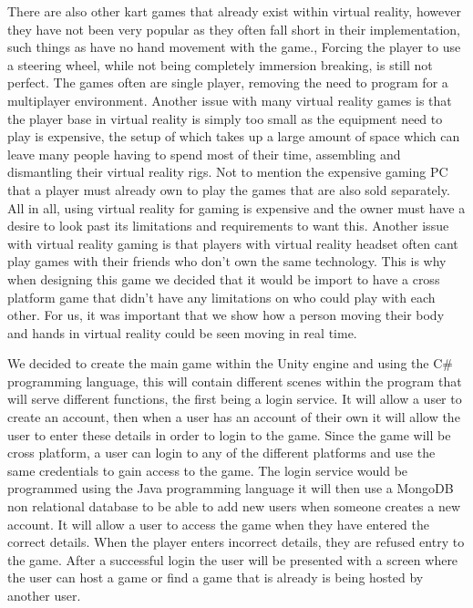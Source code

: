 There are also other kart games that already exist within virtual reality, however they have not been very popular as they often fall short in their implementation, such things as have no hand movement with the game., Forcing the player to use a steering wheel, while not being completely immersion breaking, is still not perfect. The games often are single player, removing the need to program for a multiplayer environment. Another issue with many virtual reality games is that the player base in virtual reality is simply too small as the equipment need to play is expensive, the setup of which takes up a large amount of space which can leave many people having to spend most of their time, assembling and dismantling their virtual reality rigs. Not to mention the expensive gaming PC that a player must already own to play the games that are also sold separately. All in all, using virtual reality for gaming is expensive and the owner must have a desire to look past its limitations and requirements to want this. Another issue with virtual reality gaming is that players with virtual reality headset often cant play games with their friends who don't own the same technology. This is why when designing this game we decided that it would be import to have a cross platform game that didn't have any limitations on who could play with each other. For us, it was important that we show how a person moving their body and hands in virtual reality could be seen moving in real time.
\newline

We decided to create the main game within the Unity engine and using the C# programming language, this will contain different scenes within the program that will serve different functions, the first being a login service. It will allow a user to create an account, then when a user has an account of their own it will allow the user to enter these details in order to login to the game. Since the game will be cross platform, a user can login to any of the different platforms and use the same credentials to gain access to the game. The login service would be programmed using the Java programming language it will then use a MongoDB non relational database to be able to add new users when someone creates a new account. It will allow a user to access the game when they have entered the correct details. When the player enters incorrect details, they are refused entry to the game. After a successful login the user will be presented with a screen where the user can host a game or find a game that is already is being hosted by another user.\newline  

